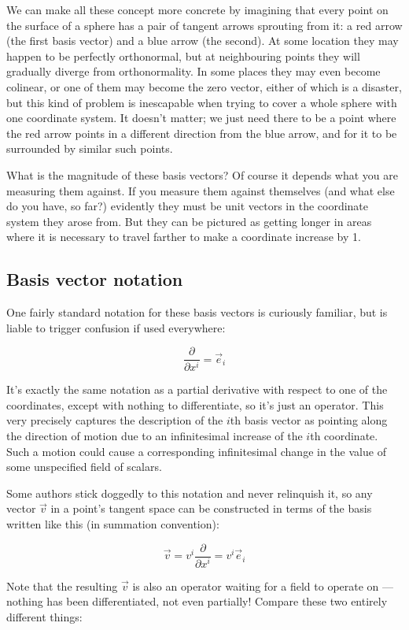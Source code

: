 We can make all these concept more concrete by imagining that every point on the surface of a sphere has a pair of tangent arrows sprouting from it: a red arrow (the first basis vector) and a blue arrow (the second). At some location they may happen to be perfectly orthonormal, but at neighbouring points they will gradually diverge from orthonormality. In some places they may even become colinear, or one of them may become the zero vector, either of which is a disaster, but this kind of problem is inescapable when trying to cover a whole sphere with one coordinate system. It doesn't matter; we just need there to be a point where the red arrow points in a different direction from the blue arrow, and for it to be surrounded by similar such points.

What is the magnitude of these basis vectors? Of course it depends what you are measuring them against. If you measure them against themselves (and what else do you have, so far?) evidently they must be unit vectors in the coordinate system they arose from. But they can be pictured as getting longer in areas where it is necessary to travel farther to make a coordinate increase by 1.

\subsection{Basis vector notation}

One fairly standard notation for these basis vectors is curiously familiar, but is liable to trigger confusion if used everywhere:

$$
\frac{\partial}{\partial x^i} = \vec{e}_i
$$

It's exactly the same notation as a partial derivative with respect to one of the coordinates, except with nothing to differentiate, so it's just an operator. This very precisely captures the description of the $i$th basis vector as pointing along the direction of motion due to an infinitesimal increase of the $i$th coordinate. Such a motion could cause a corresponding infinitesimal change in the value of some unspecified field of scalars.

Some authors stick doggedly to this notation and never relinquish it, so any vector $\vec{v}$ in a point's tangent space can be constructed in terms of the basis written like this (in summation convention):

$$
\vec{v} 
= 
v^i \frac{\partial}{\partial x^i}
= 
v^i \vec{e}_i
$$

Note that the resulting $\vec{v}$ is also an operator waiting for a field to operate on --- nothing has been differentiated, not even partially! Compare these two entirely different things:

